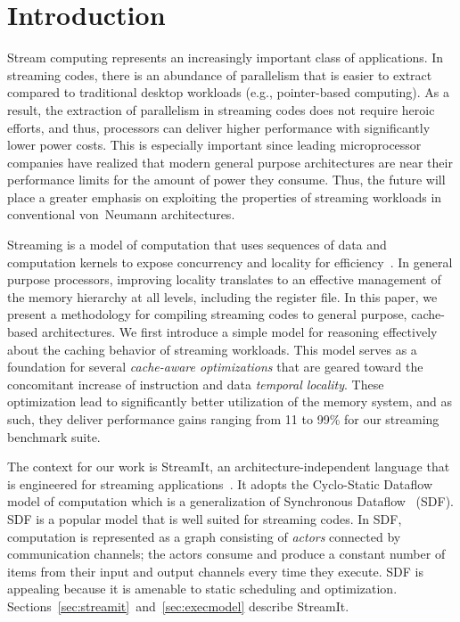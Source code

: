 \section{Introduction}


Stream computing represents an increasingly important class of
applications. In streaming codes, there is an abundance of parallelism that
is easier to extract compared to traditional desktop workloads (e.g.,
pointer-based computing). As a result, the extraction of parallelism
in streaming codes does not require heroic efforts, and thus,
processors can deliver higher performance with significantly lower
power costs. This is especially important since
leading microprocessor companies have realized that modern general
purpose architectures are near their  performance limits for  the
amount of power they consume. Thus, the future will place a greater
emphasis on exploiting the properties of streaming workloads in
conventional von~Neumann architectures.

Streaming is a model of computation that uses sequences of data
and computation kernels to expose concurrency and locality for
efficiency~\cite{wss}. In general purpose processors, improving locality 
translates to an effective management of the memory hierarchy at all
levels, including the register file. In this paper, we present a
methodology for compiling streaming codes to general purpose,
cache-based architectures. We first introduce a simple model for
reasoning effectively about the caching behavior of streaming
workloads. This model serves as a foundation for several {\it cache-aware
optimizations} that are geared toward the concomitant increase of instruction
and data {\it temporal locality}. These
optimization lead to significantly better utilization of the memory
system, and as such, they deliver performance gains ranging from 11
to 99\% for our streaming benchmark suite.

The context for our work is StreamIt, an architecture-independent
language that is engineered for streaming
applications~\cite{streamitcc}. It adopts the 
Cyclo-Static Dataflow~\cite{BELP96} model of computation which is a
generalization of Synchronous Dataflow~\cite{LM87-i} (SDF).  
SDF is a popular  model that  is well suited for
streaming codes. In SDF, computation is represented as a graph
consisting of {\it  actors} connected by communication channels; the
actors consume  and produce a constant number  of items from their
input and output  channels every time they execute. SDF is appealing
because it is amenable to static scheduling and
optimization. Sections~\ref{sec:streamit}~and~\ref{sec:execmodel}
describe StreamIt.

